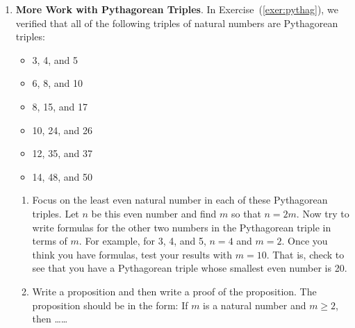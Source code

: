 \begin{enumerate}
\item \textbf{More Work with Pythagorean Triples}. \label{exer:morepythag}
In Exercise~({\ref{exer:pythag}}), we verified that all of the following triples of natural numbers are Pythagorean triples:  
\begin{multicols}{3}
\begin{itemize}
\item 3, 4, and 5
\item 6, 8, and 10
\item 8, 15, and 17
\item 10, 24, and 26
\item 12, 35, and 37
\item 14, 48, and 50
\end{itemize}
\end{multicols}

\begin{enumerate} \label{exer:sec12-morepythag}
  \item Focus on the least even natural number in each of these Pythagorean triples.  Let  $n$ be this even number and find $m$ so that $n = 2m$.  Now try to write formulas for the other two numbers in the Pythagorean triple in terms of $m$.  For example, for 3, 4, and 5, $n = 4$ and $m = 2$. %
Once you think you have formulas, test your results with $m = 10$.  That is, check to see that you have a Pythagorean triple whose smallest even number is 20.
\item Write a proposition and then write a proof of the proposition.  The proposition should be in the form:  If $m$ is a natural number and $m \geq 2$, then \ldots \ldots
\end{enumerate}

\end{enumerate}
\hbreak


%
%
%


